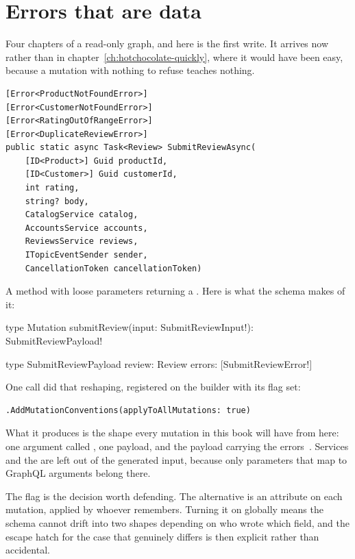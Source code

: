 \section{Errors that are data}
\label{sec:ch05-errors-that-are-data}

Four chapters of a read-only graph, and here is the first write. It arrives now
rather than in chapter~\ref{ch:hotchocolate-quickly}, where it would have been
easy, because a mutation with nothing to refuse teaches nothing.

\begin{verbatim}
[Error<ProductNotFoundError>]
[Error<CustomerNotFoundError>]
[Error<RatingOutOfRangeError>]
[Error<DuplicateReviewError>]
public static async Task<Review> SubmitReviewAsync(
    [ID<Product>] Guid productId,
    [ID<Customer>] Guid customerId,
    int rating,
    string? body,
    CatalogService catalog,
    AccountsService accounts,
    ReviewsService reviews,
    ITopicEventSender sender,
    CancellationToken cancellationToken)
\end{verbatim}

A method with loose parameters returning a . Here is what the
schema makes of it:

\begin{graphqlsdl}
type Mutation {
  submitReview(input: SubmitReviewInput!): SubmitReviewPayload!
}

type SubmitReviewPayload {
  review: Review
  errors: [SubmitReviewError!]
}
\end{graphqlsdl}

%
One call did that reshaping, registered on the builder with its
 flag set:

\begin{verbatim}
.AddMutationConventions(applyToAllMutations: true)
\end{verbatim}

What it produces is the shape every mutation in this book will have from here:
one argument called , one payload, and the payload carrying the
errors~\autocite{chillicream2026mutations}. Services and the
 are left out of the generated input, because only
parameters that map to GraphQL arguments belong there.

The  flag is the decision worth defending. The
alternative is an attribute on each mutation, applied by whoever remembers.
Turning it on globally means the schema cannot drift into two shapes depending
on who wrote which field, and the escape hatch for the case that genuinely
differs is then explicit rather than accidental.

